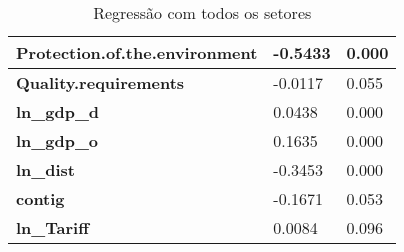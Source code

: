 \begin{table}[h]
\begin{tabular}{@{}lll@{}}
    \multicolumn{1}{l|}{\textbf{Protection.of.the.environment}}                             & \multicolumn{1}{l|}{-0.5433} & 0.000         \\ \midrule
    \multicolumn{1}{l|}{\textbf{Quality.requirements}}                                      & \multicolumn{1}{l|}{-0.0117} & 0.055           \\ \midrule
    \multicolumn{1}{l|}{\textbf{ln\_gdp\_d}}                                                & \multicolumn{1}{l|}{0.0438}  & 0.000            \\ \midrule
    \multicolumn{1}{l|}{\textbf{ln\_gdp\_o}}                                                & \multicolumn{1}{l|}{0.1635}  & 0.000            \\ \midrule
    \multicolumn{1}{l|}{\textbf{ln\_dist}}                                                  & \multicolumn{1}{l|}{-0.3453} & 0.000           \\ \midrule
    \multicolumn{1}{l|}{\textbf{contig}}                                                    & \multicolumn{1}{l|}{-0.1671} & 0.053           \\ \midrule
    \textbf{ln\_Tariff}                                                                     & 0.0084                       & 0.096            \\ \bottomrule
    \end{tabular}
    \caption{Regressão com todos os setores}
    \label{tab:my-table}
\end{table}